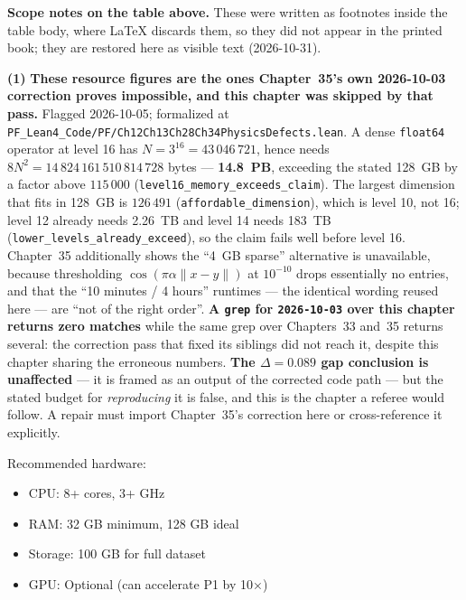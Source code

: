 \medskip
\noindent\textbf{Scope notes on the table above.} These were
written as footnotes inside the table body, where \LaTeX{}
discards them, so they did not appear in the printed book;
they are restored here as visible text (2026-10-31).
\begin{footnotesize}

\noindent\textbf{(1)} \textbf{These resource figures are the ones Chapter~35's own 2026-10-03 correction proves impossible, and this chapter was skipped by that pass.} Flagged 2026-10-05; formalized at \texttt{PF\_Lean4\_Code/PF/Ch12Ch13Ch28Ch34PhysicsDefects.lean}. A dense \texttt{float64} operator at level 16 has $N = 3^{16} = 43\,046\,721$, hence needs $8N^2 = 14\,824\,161\,510\,814\,728$ bytes --- \textbf{14.8~PB}, exceeding the stated 128~GB by a factor above $115\,000$ (\texttt{level16\_memory\_exceeds\_claim}). The largest dimension that fits in 128~GB is $126\,491$ (\texttt{affordable\_dimension}), which is level 10, not 16; level 12 already needs 2.26~TB and level 14 needs 183~TB (\texttt{lower\_levels\_already\_exceed}), so the claim fails well before level 16. Chapter~35 additionally shows the ``4~GB sparse'' alternative is unavailable, because thresholding $\cos(\pi\alpha\|x-y\|)$ at $10^{-10}$ drops essentially no entries, and that the ``10 minutes / 4 hours'' runtimes --- the identical wording reused here --- are ``not of the right order''. \textbf{A \texttt{grep} for \texttt{2026-10-03} over this chapter returns zero matches} while the same grep over Chapters~33 and~35 returns several: the correction pass that fixed its siblings did not reach it, despite this chapter sharing the erroneous numbers. \textbf{The $\Delta = 0.089$ gap conclusion is unaffected} --- it is framed as an output of the corrected code path --- but the stated budget for \emph{reproducing} it is false, and this is the chapter a referee would follow. A repair must import Chapter~35's correction here or cross-reference it explicitly.
\end{footnotesize}


Recommended hardware:
\begin{itemize}
\item CPU: 8+ cores, 3+ GHz
\item RAM: 32 GB minimum, 128 GB ideal
\item Storage: 100 GB for full dataset
\item GPU: Optional (can accelerate P1 by 10×)
\end{itemize}

